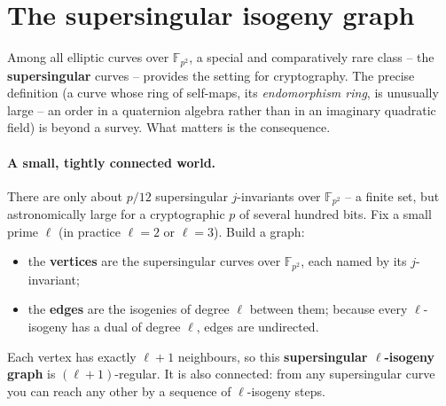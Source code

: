 \section{The supersingular isogeny graph}

Among all elliptic curves over $\mathbb{F}_{p^2}$, a special and comparatively rare class -- the \textbf{supersingular} curves -- provides the setting for cryptography. The precise definition (a curve whose ring of self-maps, its \emph{endomorphism ring}, is unusually large -- an order in a quaternion algebra rather than in an imaginary quadratic field) is beyond a survey. What matters is the consequence.

\paragraph{A small, tightly connected world.}
There are only about $p/12$ supersingular $j$-invariants over $\mathbb{F}_{p^2}$ -- a finite set, but astronomically large for a cryptographic $p$ of several hundred bits. Fix a small prime $\ell$ (in practice $\ell = 2$ or $\ell = 3$). Build a graph:
\begin{itemize}
  \item the \textbf{vertices} are the supersingular curves over $\mathbb{F}_{p^2}$, each named by its $j$-invariant;
  \item the \textbf{edges} are the isogenies of degree $\ell$ between them; because every $\ell$-isogeny has a dual of degree $\ell$, edges are undirected.
\end{itemize}
Each vertex has exactly $\ell + 1$ neighbours, so this \textbf{supersingular $\ell$-isogeny graph} is $(\ell+1)$-regular. It is also connected: from any supersingular curve you can reach any other by a sequence of $\ell$-isogeny steps.

